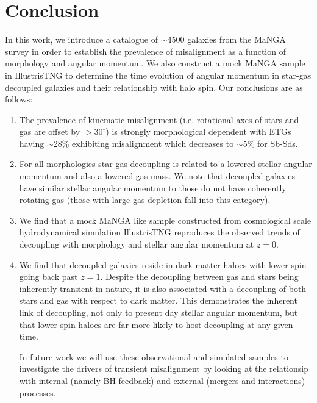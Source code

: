 \documentclass[fleqn,usenatbib]{mnras}
\begin{document}
\section{Conclusion} \label{sec:conclusion}
In this work, we introduce a catalogue of $\sim$4500 galaxies from the MaNGA survey in order to establish the prevalence of misalignment as a function of morphology and angular momentum. We also construct a mock MaNGA sample in IllustrisTNG to determine the time evolution of angular momentum in star-gas decoupled galaxies and their relationship with halo spin. Our conclusions are as follows:
\begin{enumerate}
    \item The prevalence of kinematic misalignment (i.e. rotational axes of stars and gas are offset by $> 30^{\circ}$) is strongly morphological dependent with ETGs having $\sim$28\% exhibiting misalignment which decreases to $\sim$5\% for Sb-Sds. 
    \item For all morphologies star-gas decoupling is related to a lowered stellar angular momentum and also a lowered gas mass. We note that decoupled galaxies have similar stellar angular momentum to those do not have coherently rotating gas (those with large gas depletion fall into this category). 
    
    \item We find that a mock MaNGA like sample constructed from cosmological scale hydrodynamical simulation IllustrisTNG reproduces the observed trends of decoupling with morphology and stellar angular momentum at $z=0$.
    
    \item We find that decoupled galaxies reside in dark matter haloes with lower spin going back past $z=1$. Despite the decoupling between gas and stars being inherently transient in nature, it is also associated with a decoupling of both stars and gas with respect to dark matter. This demonstrates the inherent link of decoupling, not only to present day stellar angular momentum, but that lower spin haloes are far more likely to host decoupling at any given time. 

In future work we will use these observational and simulated samples to investigate the drivers of transient misalignment by looking at the relationsip with internal (namely BH feedback) and external (mergers and interactions) processes. 

\end{enumerate}



\end{document}
